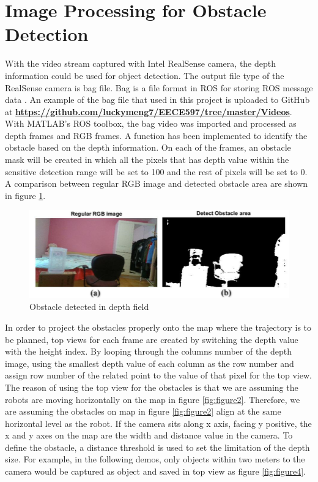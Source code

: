 \documentclass[
  oneside]{ubcthesis}
\begin{document}
\hypertarget{image-processing-for-obstacle-detection}{%
\section{Image Processing for Obstacle Detection}\label{image-processing-for-obstacle-detection}}

With the video stream captured with Intel RealSense camera, the depth information could be used for object detection. The output file type of the RealSense camera is bag file. Bag is a file format in ROS for storing ROS message data \citep{bag}. An example of the bag file that used in this project is uploaded to GitHub at \textbf{\url{https://github.com/luckymeng7/EECE597/tree/master/Videos}}. With MATLAB's ROS toolbox, the bag video was imported and processed as depth frames and RGB frames. A function has been implemented to identify the obstacle based on the depth information. On each of the frames, an obstacle mask will be created in which all the pixels that has depth value within the sensitive detection range will be set to 100 and the rest of pixels will be set to 0. A comparison between regular RGB image and detected obstacle area are shown in figure \ref{fig:figure3}.

\begin{figure}

{\centering \includegraphics[width=0.8\linewidth]{figures/3} 

}

\caption{Obstacle detected in depth field}\label{fig:figure3}
\end{figure}



In order to project the obstacles properly onto the map where the trajectory is to be planned, top views for each frame are created by switching the depth value with the height index. By looping through the columns number of the depth image, using the smallest depth value of each column as the row number and assign row number of the related point to the value of that pixel for the top view. The reason of using the top view for the obstacles is that we are assuming the robots are moving horizontally on the map in figure \ref{fig:figure2}. Therefore, we are assuming the obstacles on map in figure \ref{fig:figure2} align at the same horizontal level as the robot. If the camera sits along x axis, facing y positive, the x and y axes on the map are the width and distance value in the camera. To define the obstacle, a distance threshold is used to set the limitation of the depth size. For example, in the following demos, only objects within two meters to the camera would be captured as object and saved in top view as figure \ref{fig:figure4}.
\end{document}
